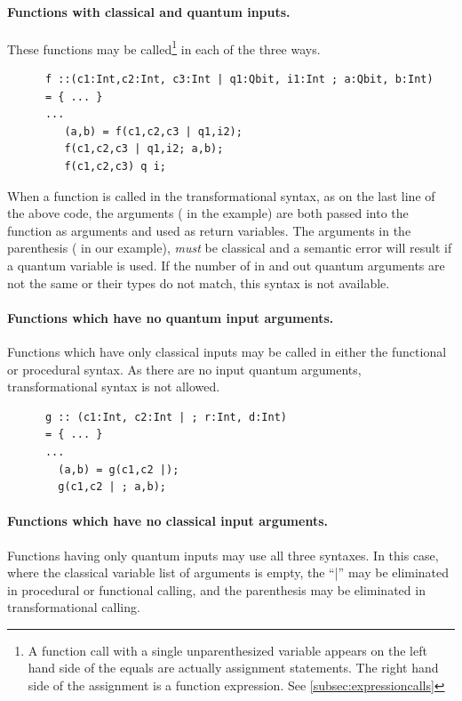 \paragraph{Functions with classical and quantum inputs.}
These functions  may be called\footnote{A function
call with a  single unparenthesized variable appears on the
left hand side of the equals
 are
 actually assignment statements. The  right hand side of the assignment 
is a function expression.
See \vref{subsec:expressioncalls}} in each of the
three ways.
\begin{lstlisting}
      f ::(c1:Int,c2:Int, c3:Int | q1:Qbit, i1:Int ; a:Qbit, b:Int)
      = { ... }
      ...
         (a,b) = f(c1,c2,c3 | q1,i2);
         f(c1,c2,c3 | q1,i2; a,b);
         f(c1,c2,c3) q i;
\end{lstlisting}

When a function is called in the transformational syntax, as on the last 
line of the above code, the arguments ( in the example) are 
both passed into
the function as arguments and used as return variables. 
The arguments in the parenthesis (  in our example),
\emph{must} be classical and a
 semantic error will result if a quantum variable is used.
If the number of in and out quantum arguments are not the same
or their types
do not match, this syntax is not available.


\paragraph{Functions which have no quantum input arguments.}
Functions which have only classical  inputs 
may be called in either the functional or procedural 
syntax. As there are no input quantum arguments, transformational
syntax is not allowed.

\begin{lstlisting}
      g :: (c1:Int, c2:Int | ; r:Int, d:Int) 
      = { ... }
      ...
        (a,b) = g(c1,c2 |);
        g(c1,c2 | ; a,b);
\end{lstlisting}


\paragraph{Functions which have no classical input arguments.}
Functions having only quantum  inputs may use
all three syntaxes. In this case, where the classical
variable list of arguments is empty, the ``|'' may 
be eliminated in procedural or functional calling, and the 
parenthesis may be eliminated in transformational calling.

